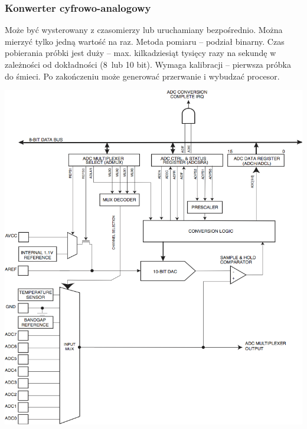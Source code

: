 \documentclass[8pt]{beamer}
\begin{document}
\begin{frame}
  \frametitle{Konwerter cyfrowo-analogowy}

  Może być wysterowany z czasomierzy lub uruchamiany bezpośrednio.  Można
  mierzyć tylko jedną wartość na raz. Metoda pomiaru -- podział binarny. Czas
  pobierania próbki jest duży -- max. kilkadziesiąt tysięcy razy na sekundę w
  zależności od dokładności (8~lub 10 bit). Wymaga kalibracji -- pierwsza
  próbka do śmieci. Po zakończeniu może generować przerwanie i wybudzać procesor.

  \begin{center}
    \includegraphics[scale=0.4]{images/adc.png}
  \end{center}
\end{frame}
\end{document}
